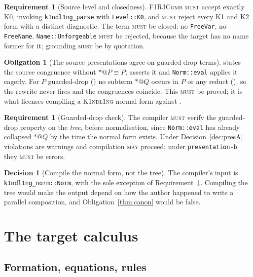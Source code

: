 \documentclass[11pt,a4paper]{article}
\makeatletter
\newcommand{\code}[1]{\texttt{#1}}
\newcommand{\Comb}{\textsc{F1R3Comb}}
\newcommand{\Kind}{\textsc{K1ndl1ng}}
\newcommand{\MUST}{\textsc{must}}
\newcommand{\MAY}{\textsc{may}}
\newcommand{\quo}[1]{@#1}
\newcommand{\drp}[1]{{*}#1}
\newcommand{\scong}{\equiv}
\theoremstyle{definition}
\newtheorem{requirement}[definition]{Requirement}
\newtheorem{decision}[definition]{Decision}
\newtheorem{obligation}[definition]{Obligation}
\theoremstyle{plain}
\makeatother
\begin{document}
\begin{requirement}[Source level and closedness]\label{req:level}
\Comb{} \MUST{} accept exactly K0, invoking \code{k1ndl1ng\_parse} with
\code{Level::K0}, and \MUST{} reject every K1 and K2 form with a distinct
diagnostic. The term \MUST{} be closed: no \code{FreeVar}, no
\code{FreeName}. \code{Name::Unforgeable} \MUST{} be rejected, because the
target has no name former for it; grounding \MUST{} be by quotation.
\end{requirement}

\begin{obligation}[The source presentations agree on guarded-drop terms]
\label{obl:srcagree}
\cite[\S2]{draft3} states the source congruence without $\drp{\quo{P}} \scong
P$; \cite[Def.~2.6]{k1ndl1ng} asserts it and \code{Norm::eval} applies it
eagerly. For $P$ guarded-drop (\cite[Def.~2.5]{draft3}) no subterm
$\drp{\quo{Q}}$ occurs in $P$ or any reduct (\cite[Lem.~2.6]{draft3}), so the
rewrite never fires and the congruences coincide. This \MUST{} be proved; it
is what licenses compiling a \Kind{} normal form against \cite[\S2]{draft3}.
\end{obligation}

\begin{requirement}[Guarded-drop check]\label{req:guarded}
The compiler \MUST{} verify the guarded-drop property on the \emph{tree},
before normalisation, since \code{Norm::eval} has already collapsed
$\drp{\quo{Q}}$ by the time the normal form exists. Under
Decision~\ref{dec:presA} violations are warnings and compilation \MAY{}
proceed; under \code{presentation-b} they \MUST{} be errors.
\end{requirement}

\begin{decision}[Compile the normal form, not the tree]
The compiler's input is \code{k1ndl1ng\_norm::Norm}, with the sole exception of
Requirement~\ref{req:guarded}. Compiling the tree would make the output depend
on how the author happened to write a parallel composition, and
Obligation~\ref{thm:canon} would be false.
\end{decision}

\section{The target calculus}\label{sec:target}

\subsection{Formation, equations, rules}
\end{document}
